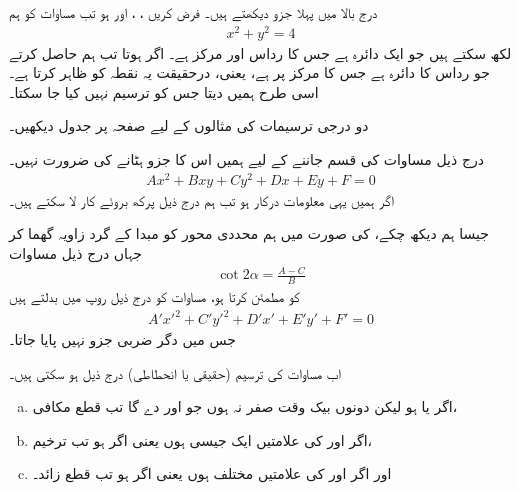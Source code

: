 درج بالا میں  پہلا جزو دیکھتے ہیں۔ فرض کریں ، ، اور  ہو تب  مساوات  کو ہم
\begin{align*}
 x^2+y^2=4
\end{align*}
لکھ سکتے ہیں جو ایک دائرہ ہے جس کا رداس  اور مرکز  ہے۔ اگر  ہوتا تب ہم  حاصل کرتے  جو رداس   کا دائرہ ہے جس کا مرکز  پر ہے، یعنی، درحقیقت یہ نقطہ   کو ظاہر کرتا ہے۔اسی طرح    ہمیں   دیتا   جس کو ترسیم نہیں کیا جا سکتا۔

دو درجی ترسیمات کی مثالوں کے لیے صفحہ  پر جدول   دیکھیں۔


درج ذیل مساوات کی قسم جاننے کے لیے ہمیں اس کا جزو  ہٹانے کی ضرورت نہیں۔
\begin{align}\label{مساوات_مخروط_ممیز_پرکھ_الف}
Ax^2+Bxy+Cy^2+Dx+Ey+F=0
\end{align}
 اگر ہمیں یہی معلومات درکار ہو تب ہم درج  ذیل پرکھ بروئے کار لا سکتے ہیں۔

جیسا ہم دیکھ چکے،  کی صورت میں ہم محددی محور کو مبدا کے گرد  زاویہ گھما کر جہاں  درج ذیل مساوات
\begin{align}\label{مساوات_مخروط_ممیز_پرکھ_ب}
\cot 2\alpha=\frac{A-C}{B}
\end{align}
کو مطمئن کرتا ہو، مساوات  کو درج ذیل روپ میں بدلتے ہیں
\begin{align}\label{مساوات_مخروط_ممیز_پرکھ_پ}
A'x'^2+C'y'^2+D'x'+E'y'+F'=0
\end{align}
جس میں دگر ضربی جزو نہیں پایا جاتا۔

اب مساوات  کی ترسیم (حقیقی یا انحطاطی) درج ذیل ہو سکتی ہیں۔
\begin{enumerate}[a.]
\item
اگر  یا    ہو لیکن دونوں بیک وقت صفر نہ ہوں جو  اور    دے گا  تب قطع مکافی،
\item
اگر  اور  کی علامتیں ایک  جیسی ہوں یعنی اگر  ہو تب ترخیم،
\item
اور اگر  اور  کی علامتیں مختلف  ہوں یعنی اگر  ہو تب قطع زائد۔
\end{enumerate}

